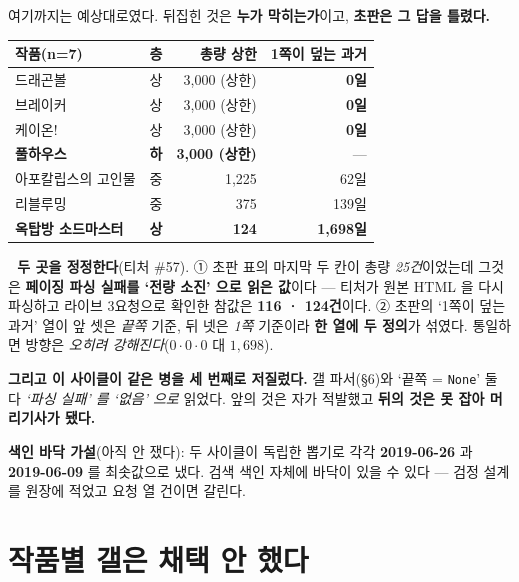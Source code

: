 \documentclass[10pt]{article}
\begin{document}
여기까지는 예상대로였다. 뒤집힌 것은 \textbf{누가 막히는가}이고,
\textbf{초판은 그 답을 틀렸다.}

\begin{center}\small
\begin{tabular}{lcrr}
\toprule
작품(n=7) & 층 & 총량 상한 & \textbf{1쪽}이 덮는 과거 \\
\midrule
드래곤볼 & 상 & 3,000 (상한) & \textbf{0일} \\
브레이커 & 상 & 3,000 (상한) & \textbf{0일} \\
케이온! & 상 & 3,000 (상한) & \textbf{0일} \\
\textbf{풀하우스} & \textbf{하} & \textbf{3,000 (상한)} & --- \\
아포칼립스의 고인물 & 중 & 1,225 & 62일 \\
리블루밍 & 중 & 375 & 139일 \\
\textbf{옥탑방 소드마스터} & \textbf{상} & \textbf{124} & \textbf{1,698일} \\
\bottomrule
\end{tabular}
\end{center}

\textbf{🔴 두 곳을 정정한다}(티처 \#57). ① 초판 표의 마지막 두 칸이 총량
\emph{25건}이었는데 그것은 \textbf{페이징 파싱 실패를 `전량 소진' 으로 읽은
값}이다 --- 티처가 원본 HTML 을 다시 파싱하고 라이브 3요청으로 확인한 참값은
\textbf{116 · 124건}이다. ② 초판의 `1쪽이 덮는 과거' 열이 앞 셋은 \emph{끝쪽}
기준, 뒤 넷은 \emph{1쪽} 기준이라 \textbf{한 열에 두 정의}가 섞였다. 통일하면
방향은 \emph{오히려 강해진다}($0 \cdot 0 \cdot 0$ 대 $1{,}698$).


\textbf{그리고 이 사이클이 같은 병을 세 번째로 저질렀다.} 갤 파서(§6)와
`끝쪽 = \texttt{None}' 둘 다 \emph{`파싱 실패' 를 `없음' 으로} 읽었다. 앞의
것은 자가 적발했고 \textbf{뒤의 것은 못 잡아 머리기사가 됐다.}

\textbf{색인 바닥 가설}(아직 안 쟀다): 두 사이클이 독립한 뽑기로 각각
\textbf{2019-06-26} 과 \textbf{2019-06-09} 를 최솟값으로 냈다. 검색 색인 자체에
바닥이 있을 수 있다 --- 검정 설계를 원장에 적었고 요청 열 건이면 갈린다.

\section{작품별 갤은 채택 안 했다}
\end{document}
